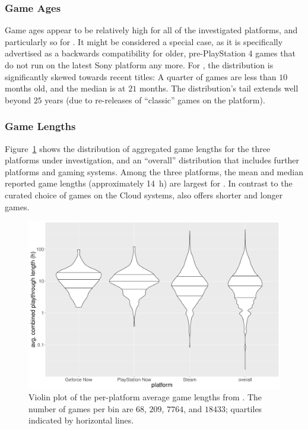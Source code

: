 \subsubsection{Game Ages}

Game ages appear to be relatively high for all of the investigated
platforms, and particularly so for \psnow. It might be considered a
special case, as it is specifically advertised as a backwards
compatibility for older, pre-PlayStation 4 games that do not run on the
latest Sony platform any more. For \steam, the distribution is
significantly skewed towards recent titles: A quarter of games are less
than $10$ months old, and the median is at $21$ months. The
distribution's tail extends well beyond $25$ years (due to re-releases
of ``classic'' games on the platform).


\subsubsection{Game Lengths}
Figure~\ref{fig:gamelengths-violin} shows the distribution of aggregated
game lengths for the three platforms under investigation, and an
``overall'' distribution that includes further platforms and gaming
systems. Among the three platforms, the mean and median reported game
lengths (approximately \SI{14}{\hour}) are largest for \gfnow. In
contrast to the curated choice of games on the Cloud systems, \steam
also offers shorter and longer games.


\begin{figure}[!t]
	\centering
	\includegraphics[width=1.0\columnwidth]{images/gamelengths-by-platform-violin.pdf}
	\caption{Violin plot of the per-platform average game lengths from \hltb. The number of games per bin are $68$, $209$, $7764$, and $18433$; quartiles indicated by horizontal lines.}
\label{fig:gamelengths-violin}
\end{figure}



